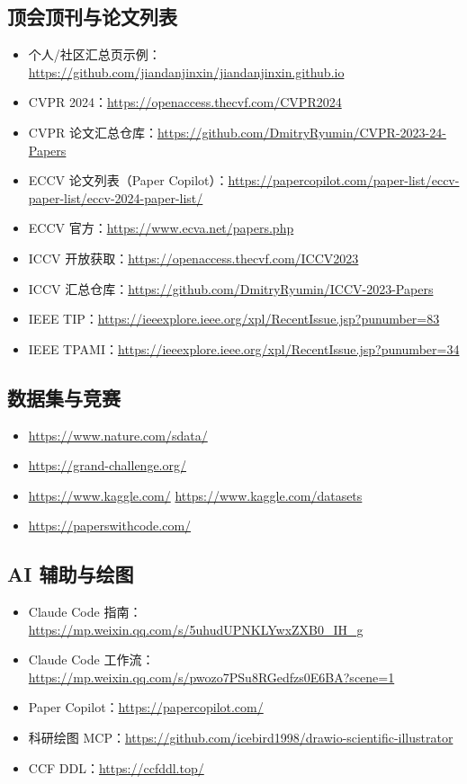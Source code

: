 \subsection{顶会顶刊与论文列表}
\begin{itemize}
  \item 个人/社区汇总页示例：\url{https://github.com/jiandanjinxin/jiandanjinxin.github.io}
  \item CVPR 2024：\url{https://openaccess.thecvf.com/CVPR2024}
  \item CVPR 论文汇总仓库：\url{https://github.com/DmitryRyumin/CVPR-2023-24-Papers}
  \item ECCV 论文列表（Paper Copilot）：\url{https://papercopilot.com/paper-list/eccv-paper-list/eccv-2024-paper-list/}
  \item ECCV 官方：\url{https://www.ecva.net/papers.php}
  \item ICCV 开放获取：\url{https://openaccess.thecvf.com/ICCV2023}
  \item ICCV 汇总仓库：\url{https://github.com/DmitryRyumin/ICCV-2023-Papers}
  \item IEEE TIP：\url{https://ieeexplore.ieee.org/xpl/RecentIssue.jsp?punumber=83}
  \item IEEE TPAMI：\url{https://ieeexplore.ieee.org/xpl/RecentIssue.jsp?punumber=34}
\end{itemize}

\subsection{数据集与竞赛}
\begin{itemize}
  \item \url{https://www.nature.com/sdata/}
  \item \url{https://grand-challenge.org/}
  \item \url{https://www.kaggle.com/} \quad \url{https://www.kaggle.com/datasets}
  \item \url{https://paperswithcode.com/}
\end{itemize}

\subsection{AI 辅助与绘图}
\begin{itemize}
  \item Claude Code 指南：\url{https://mp.weixin.qq.com/s/5uhudUPNKLYwxZXB0_IH_g}
  \item Claude Code 工作流：\url{https://mp.weixin.qq.com/s/pwozo7PSu8RGedfzs0E6BA?scene=1}
  \item Paper Copilot：\url{https://papercopilot.com/}
  \item 科研绘图 MCP：\url{https://github.com/icebird1998/drawio-scientific-illustrator}
  \item CCF DDL：\url{https://ccfddl.top/}
\end{itemize}

